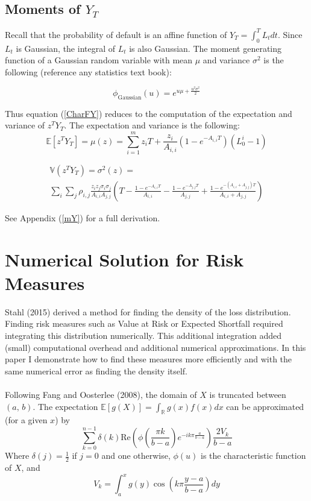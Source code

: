 \documentclass[12pt]{article}
\theoremstyle{definition}
\begin{document}
\subsection{Moments of \(Y_T\)} 

Recall that the probability of default is an affine function of \(Y_T=\int_0^T L_t dt\).  Since \(L_t\) is Gaussian, the integral of \(L_t\) is also Gaussian.  The moment generating function of a Gaussian random variable with mean \(\mu\) and variance \(\sigma^2\) is the following (reference any statistics text book):

\begin{equation}\phi_{\mathrm{Gaussian}}(u)=\label{GaussianMGF} e^{u\mu +\frac{u^2\sigma^2}{2}} \end{equation}

Thus equation (\ref{CharFY}) reduces to the computation of the expectation and variance of \(z^T Y_T\).  The expectation and variance is the following:
\begin{equation} \label{meY} \mathbb{E}[z^T Y_T]=\mu(z)=\sum_{i=1} ^ m z_i T+\frac{z_i}{A_{i,i}}\left(1-e^{-{A}_{i, i}T}\right)(L_0^ i-1)\end{equation}

\begin{multline}\label{varianceY} \mathbb{V}(z^T Y_T)=\sigma^2(z)=\\ \sum_i \sum_j \rho_{i,j} \frac{ z_i z_j \sigma_i \sigma_j}{A_{i,i} A_{j,j}} \left(T-\frac{1-e^{-A_{i,i}T}}{A_{i,i}}-\frac{1-e^{-A_{j,j}T}}{A_{j,j}}+\frac{1-e^{-(A_{i,i}+A_{j,j})T}}{A_{i,i}+A_{j,j}}\right) \end{multline}

See Appendix (\ref{mY}) for a full derivation.
\section{Numerical Solution for Risk Measures}

Stahl (2015) derived a method for finding the density of the loss distribution.  Finding risk measures such as Value at Risk or Expected Shortfall required integrating this distribution numerically.  This additional integration added (small) computational overhead and additional numerical approximations.  In this paper I demonstrate how to find these measures more efficiently and with the same numerical error as finding the density itself. 
\\
\\
Following Fang and Oosterlee (2008), the domain of \(X\) is truncated between \((a,\,b)\).  The expectation 
\(\mathbb{E}[g(X)]=\int_\mathbb{R} g(x) f(x)dx \) can be approximated (for a given \(x\)) by 
\[\sum_{k=0} ^ {n-1}\delta(k)\mathrm{Re}  \left(\phi\left(\frac{\pi k}{b-a}\right) e^{-ik\pi \frac{a}{b-a}} \right) \frac{2V_k}{b-a} \]
Where \(\delta(j)=\frac{1}{2}\) if \(j=0\) and one otherwise, \(\phi(u)\) is the characteristic function of \(X\), and \[V_k=\int_{a}^{x} g(y) \cos \left(k\pi \frac{y-a}{b-a} \right) dy\] 
\end{document}

